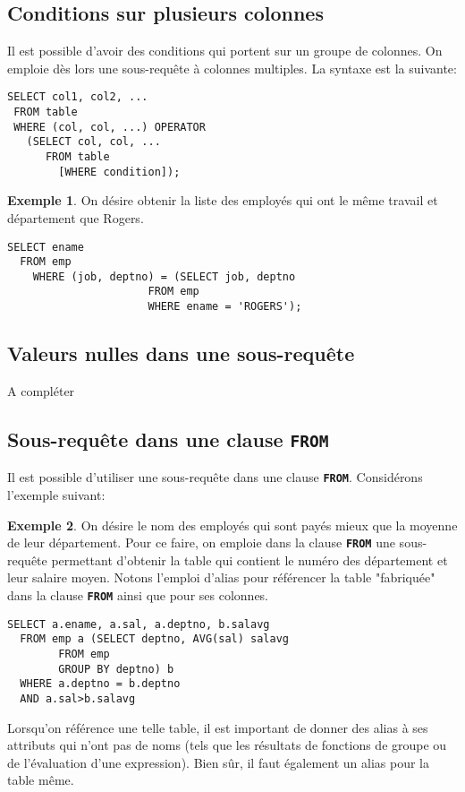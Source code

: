 \documentclass[a4paper, 12pt]{report}
\newcommand{\textSQL}[1]{\texttt{\textbf{#1}}}
\theoremstyle{definition} \newtheorem{ex}{Exemple}
\begin{document}
\subsection{Conditions sur plusieurs colonnes}
Il est possible d'avoir des conditions qui portent sur un groupe de colonnes. On emploie dès lors une sous-requête à colonnes multiples. La syntaxe est la suivante:
\begin{lstlisting}[frame=single]
SELECT col1, col2, ...
 FROM table
 WHERE (col, col, ...) OPERATOR
   (SELECT col, col, ...
	  FROM table
		[WHERE condition]);
\end{lstlisting}
\begin{ex}
On désire obtenir la liste des employés qui ont le même travail et département que Rogers.
	\begin{lstlisting}[frame=single]
SELECT ename
  FROM emp
	WHERE (job, deptno) = (SELECT job, deptno
		              FROM emp
		              WHERE ename = 'ROGERS');
	\end{lstlisting}
\end{ex}

\subsection{Valeurs nulles dans une sous-requête}
A compléter

\subsection{Sous-requête dans une clause \textSQL{FROM}}
Il est possible d'utiliser une sous-requête dans une clause \textSQL{FROM}. Considérons l'exemple suivant:
\begin{ex}
 On désire le nom des employés qui sont payés mieux que la moyenne de leur département. Pour ce faire, on emploie dans la clause \textSQL{FROM} une sous-requête permettant d'obtenir la table qui contient le numéro des département et leur salaire moyen. Notons l'emploi d'alias pour référencer la table "fabriquée" dans la clause \textSQL{FROM} ainsi que pour ses colonnes.
\begin{lstlisting}[frame=single]
SELECT a.ename, a.sal, a.deptno, b.salavg
  FROM emp a (SELECT deptno, AVG(sal) salavg
	    FROM emp
	    GROUP BY deptno) b
  WHERE a.deptno = b.deptno
  AND a.sal>b.salavg
\end{lstlisting}
\end{ex}

Lorsqu'on référence une telle table, il est important de donner des alias à ses attributs qui n'ont pas de noms (tels que les résultats de fonctions de groupe ou de l'évaluation d'une expression). Bien sûr, il faut également un alias pour la table même.
\end{document}
